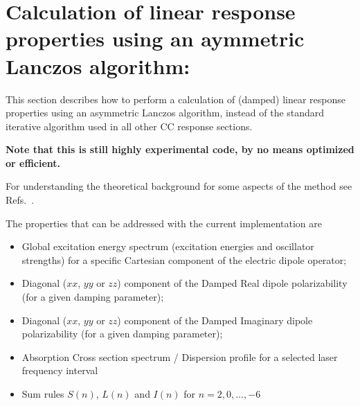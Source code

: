 
\section{Calculation of linear response properties using an aymmetric Lanczos algorithm: }\label{sec:cclrlanczos}

This section describes how to perform a calculation of (damped) 
linear response properties using an asymmetric Lanczos algorithm, 
instead of the standard iterative algorithm used in all other CC response sections.

{\bf Note that this is still highly experimental code, by no means optimized or efficient.}

For understanding the theoretical background for some
aspects of the method see Refs.\ \cite{Coriani:JCTC8,Coriani:PRA85}.

The properties that can be addressed with the current implementation are
\begin{itemize}
\item Global excitation energy spectrum (excitation energies and oscillator strengths) for a 
specific Cartesian component of the electric dipole operator;
\item Diagonal ($xx$, $yy$ or $zz$) component of the Damped 
Real dipole polarizability (for a given damping parameter);
\item Diagonal ($xx$, $yy$ or $zz$) component of the Damped 
Imaginary  dipole polarizability (for a given damping parameter);
\item Absorption Cross section spectrum / Dispersion profile for a selected 
laser frequency interval
\item Sum rules $S(n)$, $L(n)$ and $I(n)$ for $n=2,0,...,-6$
\end{itemize}

\begin{center}
\end{center}

